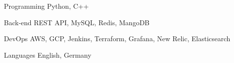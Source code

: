

\begin{cvskills}

  \cvskill
    {Programming} %
    {Python, C++} %

  \cvskill
    {Back-end} %
    {REST API, MySQL, Redis, MangoDB} %

  \cvskill
    {DevOps} %
    {AWS, GCP, Jenkins, Terraform, Grafana, New Relic, Elasticsearch} %

  \cvskill
    {Languages} %
    {English, Germany} %

\end{cvskills}
